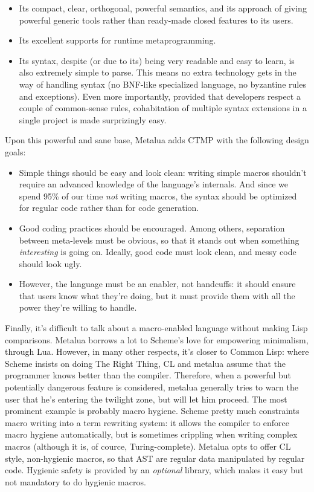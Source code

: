 \begin{itemize}
\item Its compact, clear, orthogonal, powerful semantics, and its
  approach of giving powerful generic tools rather than ready-made
  closed features to its users.
\item Its excellent supports for runtime metaprogramming.
\item Its syntax, despite (or due to its) being very readable and easy
  to learn, is also extremely simple to parse. This means no extra
  technology gets in the way of handling syntax (no BNF-like
  specialized language, no byzantine rules and exceptions). Even more
  importantly, provided that developers respect a couple of
  common-sense rules, cohabitation of multiple syntax extensions in a
  single project is made surprizingly easy.
\end{itemize}

Upon this powerful and sane base, Metalua adds CTMP with the following
design goals:

\begin{itemize}
\item Simple things should be easy and look clean: writing simple
  macros shouldn't require an advanced knowledge of the language's
  internals. And since we spend 95\% of our time {\em not} writing
  macros, the syntax should be optimized for regular code rather than
  for code generation.
\item Good coding practices should be encouraged. Among others,
  separation between meta-levels must be obvious, so that it stands
  out when something {\em interesting} is going on. Ideally, good code
  must look clean, and messy code should look ugly.
\item However, the language must be an enabler, not handcuffs: it
  should ensure that users know what they're doing, but it must
  provide them with all the power they're willing to handle.
\end{itemize}

Finally, it's difficult to talk about a macro-enabled language without making
Lisp comparisons. Metalua borrows a lot to Scheme's love for empowering
minimalism, through Lua. However, in many other respects, it's closer to Common
Lisp: where Scheme insists on doing The Right Thing, CL and metalua assume that
the programmer knows better than the compiler. Therefore, when a powerful but
potentially dangerous feature is considered, metalua generally tries to warn the
user that he's entering the twilight zone, but will let him proceed. The most
prominent example is probably macro hygiene. Scheme pretty much constraints
macro writing into a term rewriting system: it allows the compiler to enforce
macro hygiene automatically, but is sometimes crippling when writing complex
macros (although it is, of cource, Turing-complete). Metalua opts to offer CL
style, non-hygienic macros, so that AST are regular data manipulated by regular
code. Hygienic safety is provided by an {\em optional} library, which makes it
easy but not mandatory to do hygienic macros.
